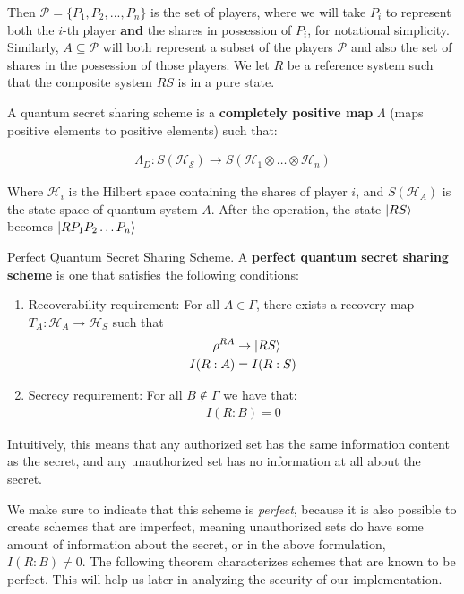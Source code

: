 Then $\mathcal{P} = \{P_1,P_2,...,P_n\}$ is the set of players, where we will take $P_i$ to represent both the $i$-th player \textbf{and} the shares in possession of $P_i$, for notational simplicity. Similarly, $A \subseteq \mathcal{P}$ will both represent a subset of the players $\mathcal{P}$ and also the set of shares in the possession of those players. We let $R$ be a reference system such that the composite system $RS$ is in a pure state.

A quantum secret sharing scheme is a \textbf{completely positive map} $\Lambda$ (maps positive elements to positive elements) such that:

\begin{align}
    \Lambda_D: S(\mathcal{H_S}) \to S(\mathcal{H}_1 \otimes \dots \otimes \mathcal{H}_n)
\end{align}

Where $\mathcal{H}_i$ is the Hilbert space containing the shares of player $i$, and $S(\mathcal{H}_A)$ is the state space of quantum system $A$. After the operation, the state $\ket{RS}$ becomes $\ket{RP_1P_2 \dots P_n}$

\begin{definition}{Perfect Quantum Secret Sharing Scheme.}
    \label{defn:perfect-qss}
    A \textbf{perfect quantum secret sharing scheme} is one that satisfies the following conditions:

    \begin{enumerate}
        \item Recoverability requirement: For all $A \in \Gamma$, there exists a recovery map $T_A: \mathcal{H}_A \to \mathcal{H}_S$ such that 
        \begin{align} 
            \rho^{RA} &\to \ket{RS} \\
            I(R:A) &= I(R:S)
        \end{align}
        \item Secrecy requirement: For all $B \notin \Gamma$ we have that:
        \begin{align}
            I(R:B) = 0
        \end{align}
    \end{enumerate}

    Intuitively, this means that any authorized set has the same information content as the secret, and any unauthorized set has no information at all about the secret.
\end{definition}

We make sure to indicate that this scheme is \textit{perfect}, because it is also possible to create schemes that are imperfect, meaning unauthorized sets do have some amount of information about the secret, or in the above formulation, $I(R:B) \neq 0$. The following theorem characterizes schemes that are known to be perfect. This will help us later in analyzing the security of our implementation.

